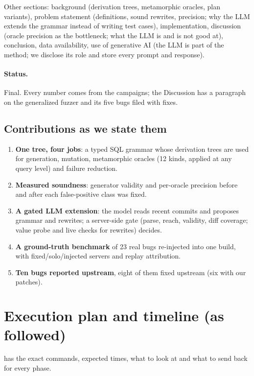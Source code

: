 Other sections: background (derivation trees, metamorphic oracles, plan variants), problem statement (definitions, sound rewrites, precision; why
the LLM extends the grammar instead of writing test cases), implementation, discussion (oracle precision as the
bottleneck; what the LLM is and is not good at), conclusion, data availability,
use of generative AI (the LLM is part of the method; we disclose its role and
store every prompt and response).

\paragraph{Status.} Final. Every number comes from the campaigns; the
Discussion has a paragraph on the generalized fuzzer and its five bugs filed with fixes.

\subsection{Contributions as we state them}
\begin{enumerate}
  \item \textbf{One tree, four jobs}: a typed SQL grammar whose derivation
    trees are used for generation, mutation, metamorphic oracles (12 kinds,
    applied at any query level) and failure reduction.
  \item \textbf{Measured soundness}: generator validity and per-oracle
    precision before and after each false-positive class was fixed.
  \item \textbf{A gated LLM extension}: the model reads recent commits and
    proposes grammar and rewrites; a server-side gate (parse, reach, validity,
    diff coverage; value probe and live checks for rewrites) decides.
  \item \textbf{A ground-truth benchmark} of 23 real \pg bugs re-injected into
    one build, with fixed/solo/injected servers and replay attribution.
  \item \textbf{Ten \pg bugs reported upstream}, eight of them fixed upstream
    (six with our patches).
\end{enumerate}

\section{Execution plan and timeline (as followed)}
\label{sec:plan}

 has the exact commands, expected times, what to
look at and what to send back for every phase.

